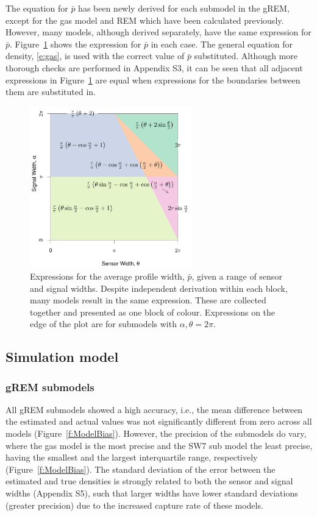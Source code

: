 \documentclass[a4paper,10pt,reqno,oneside]{amsart}
\begin{document}
The equation for $\bar{p}$ has been newly derived for each submodel in the gREM, except for the gas model and REM which have been calculated previously. However, many models, although derived separately, have the same expression for $\bar{p}$. Figure~\ref{f:equalModelResults} shows the expression for $\bar{p}$ in each case. The general equation for density, \ref{e:gas}, is used with the correct value of $\bar{p}$ substituted. Although more thorough checks are performed in Appendix S3, it can be seen that all adjacent expressions in Figure~\ref{f:equalModelResults} are equal when expressions for the boundaries between them are substituted in.

\begin{figure}
	\centering
	\includegraphics[width=7cm]{imgs/equalModelResults.pdf}
	\caption{Expressions for the average profile width, $\bar{p}$, given a range of sensor and signal widths. Despite independent derivation within each block, many models result in the same expression. These are collected together and presented as one block of colour. Expressions on the edge of the plot are for submodels with $\alpha, \theta = 2\pi$. }
	\label{f:equalModelResults}
\end{figure}



\subsection*{Simulation model}

\subsubsection*{gREM submodels}
All gREM submodels showed a high accuracy, i.e., the mean difference between the estimated and actual values was not significantly different from zero across all models (Figure~\ref{f:ModelBias}). However, the precision of the submodels do vary, where the gas model is the most precise and the SW7 sub model the least precise, having the smallest and the largest interquartile range, respectively (Figure~\ref{f:ModelBias}). The standard deviation of the error between the estimated and true densities is strongly related to both the sensor and signal widths (Appendix S5), such that larger widths have lower standard deviations (greater precision) due to the increased capture rate of these models.
\end{document}
